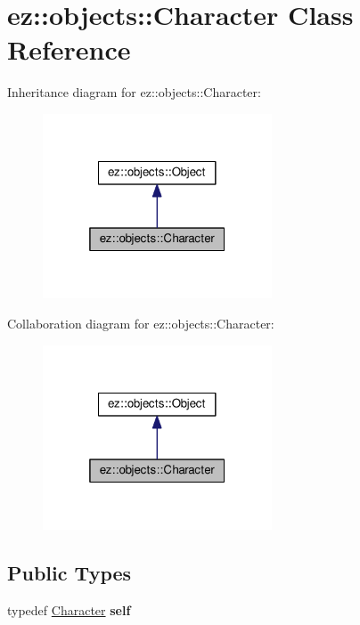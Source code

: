 \hypertarget{classez_1_1objects_1_1Character}{}\section{ez\+:\+:objects\+:\+:Character Class Reference}
\label{classez_1_1objects_1_1Character}


Inheritance diagram for ez\+:\+:objects\+:\+:Character\+:
\nopagebreak
\begin{figure}[H]
\begin{center}
\leavevmode
\includegraphics[width=193pt]{classez_1_1objects_1_1Character__inherit__graph}
\end{center}
\end{figure}


Collaboration diagram for ez\+:\+:objects\+:\+:Character\+:
\nopagebreak
\begin{figure}[H]
\begin{center}
\leavevmode
\includegraphics[width=193pt]{classez_1_1objects_1_1Character__coll__graph}
\end{center}
\end{figure}
\subsection*{Public Types}
\begin{DoxyCompactItemize}
\item 
\mbox{\label{classez_1_1objects_1_1Character_a873c6f939973433df51a33b85daa95b5}} 
typedef \hyperlink{classez_1_1objects_1_1Character}{Character} {\bfseries self}
\end{DoxyCompactItemize}

